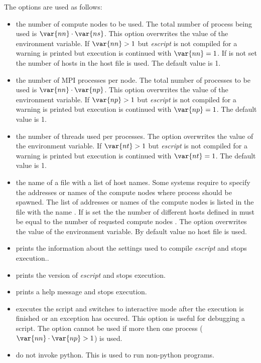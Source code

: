 The options are used as follows:
\begin{itemize}

 \item[\programopt{-n} \var{nn}] the number of compute nodes  to be used. The total number of process being used is 
$\var{nn} \cdot \var{ns}$. This option overwrites the value of the  environment variable. If $\var{nn}>1$ but {\it escript}  is not compiled for \MPI a warning is printed but execution is continued with $\var{nn}=1$. If  is not set the
number of hosts in the host file is used. The default value is 1.
 
\item[\programopt{-p} \var{np}] the number of MPI processes per node.  The total number of processes to be used is 
$\var{nn} \cdot \var{np}$. This option overwrites the value of the  environment variable. If $\var{np}>1$ but {\it escript}  is not compiled for \MPI a warning is printed but execution is continued with $\var{np}=1$. The default value is 1.

 \item[\programopt{-t} \var{nt}] the number of threads used per processes.
The option overwrites the value of the  environment variable.
If $\var{nt}>1$ but {\it escript} is not compiled for \OPENMP a warning is printed but execution is continued with $\var{nt}=1$. The default value is 1.

 \item[\programopt{-f} \var{hostfile}] the name of a file with a list of host names. Some systems require to specify the addresses or names of the compute nodes where \MPI process should be spawned. The list of addresses or names of the compute nodes is listed in the file with the name . If  is set the 
the number of different
hosts defined in  must be equal to the number of requsted compute nodes . The option overwrites the value of the  environment variable. By default value no host file is used.
 \item[\programopt{-c}] prints the information about the settings used to compile {\it escript} and stops execution..
 \item[\programopt{-V}] prints the version of {\it escript} and stops execution.
 \item[\programopt{-h}] prints a help message and stops execution.
 \item[\programopt{-i}] executes the script  and switches to interactive mode after the execution is finished or an exception has occured. This option is useful for debugging a script. The option cannot be used if more then one process ($\var{nn} \cdot \var{np}>1$) is used.
\item[\programopt{-b}] do not invoke python. This is used to run non-python programs.


\end{itemize}
